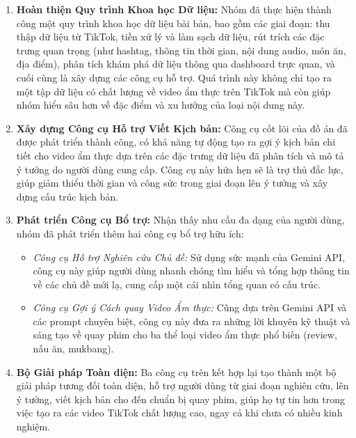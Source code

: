 \begin{enumerate}
    \item \textbf{Hoàn thiện Quy trình Khoa học Dữ liệu:} Nhóm đã thực hiện thành công một quy trình khoa học dữ liệu bài bản, bao gồm các giai đoạn: thu thập dữ liệu từ TikTok, tiền xử lý và làm sạch dữ liệu, rút trích các đặc trưng quan trọng (như hashtag, thông tin thời gian, nội dung audio, món ăn, địa điểm), phân tích khám phá dữ liệu thông qua dashboard trực quan, và cuối cùng là xây dựng các công cụ hỗ trợ. Quá trình này không chỉ tạo ra một tập dữ liệu có chất lượng về video ẩm thực trên TikTok mà còn giúp nhóm hiểu sâu hơn về đặc điểm và xu hướng của loại nội dung này.
    
    \item \textbf{Xây dựng Công cụ Hỗ trợ Viết Kịch bản:} Công cụ cốt lõi của đồ án đã được phát triển thành công, có khả năng tự động tạo ra gợi ý kịch bản chi tiết cho video ẩm thực dựa trên các đặc trưng dữ liệu đã phân tích và mô tả ý tưởng do người dùng cung cấp. Công cụ này hứa hẹn sẽ là trợ thủ đắc lực, giúp giảm thiểu thời gian và công sức trong giai đoạn lên ý tưởng và xây dựng cấu trúc kịch bản.
    
    \item \textbf{Phát triển Công cụ Bổ trợ:} Nhận thấy nhu cầu đa dạng của người dùng, nhóm đã phát triển thêm hai công cụ bổ trợ hữu ích:
    \begin{itemize}
        \item \textit{Công cụ Hỗ trợ Nghiên cứu Chủ đề:} Sử dụng sức mạnh của Gemini API, công cụ này giúp người dùng nhanh chóng tìm hiểu và tổng hợp thông tin về các chủ đề mới lạ, cung cấp một cái nhìn tổng quan có cấu trúc.

        \item \textit{Công cụ Gợi ý Cách quay Video Ẩm thực:} Cũng dựa trên Gemini API và các prompt chuyên biệt, công cụ này đưa ra những lời khuyên kỹ thuật và sáng tạo về quay phim cho ba thể loại video ẩm thực phổ biến (review, nấu ăn, mukbang).
    \end{itemize}

    \item \textbf{Bộ Giải pháp Toàn diện:} Ba công cụ trên kết hợp lại tạo thành một bộ giải pháp tương đối toàn diện, hỗ trợ người dùng từ giai đoạn nghiên cứu, lên ý tưởng, viết kịch bản cho đến chuẩn bị quay phim, giúp họ tự tin hơn trong việc tạo ra các video TikTok chất lượng cao, ngay cả khi chưa có nhiều kinh nghiệm.
\end{enumerate}

